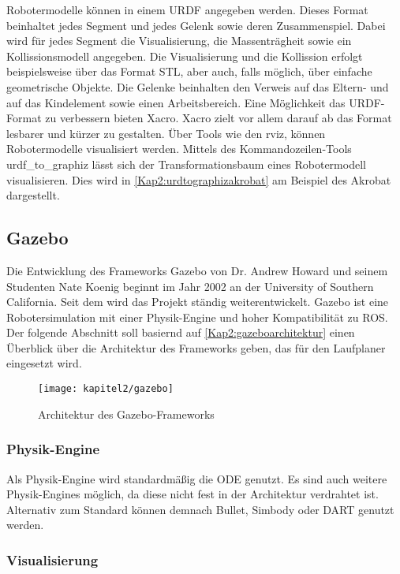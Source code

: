 Robotermodelle können in einem \ac{URDF} angegeben werden. Dieses Format beinhaltet jedes Segment und jedes Gelenk sowie deren Zusammenspiel. Dabei wird für jedes Segment die Visualisierung, die Massenträgheit sowie ein Kollissionsmodell angegeben. Die Visualisierung und die Kollission erfolgt beispielsweise über das Format \ac{STL}, aber auch, falls möglich, über einfache geometrische Objekte. Die Gelenke beinhalten den Verweis auf das Eltern- und auf das Kindelement sowie einen Arbeitsbereich. Eine Möglichkeit das \ac{URDF}-Format zu verbessern bieten \ac{Xacro}. \ac{Xacro} zielt vor allem darauf ab das Format lesbarer und kürzer zu gestalten. Über Tools wie den rviz, können Robotermodelle visualisiert werden. Mittels des Kommandozeilen-Tools urdf\_to\_graphiz lässt sich der Transformationsbaum eines Robotermodell visualisieren. Dies wird in \autoref{Kap2:urdtographizakrobat} am Beispiel des Akrobat dargestellt.

\subsection{Gazebo}

Die Entwicklung des Frameworks Gazebo von Dr. Andrew Howard und seinem Studenten Nate Koenig beginnt im Jahr 2002 an der University of Southern California. Seit dem wird das Projekt ständig weiterentwickelt. Gazebo ist eine Robotersimulation mit einer Physik-Engine und hoher Kompatibilität zu \ac{ROS}. Der folgende Abschnitt soll basiernd auf \autoref{Kap2:gazeboarchitektur} einen Überblick über die Architektur des Frameworks geben, das für den Laufplaner eingesetzt wird. \autocite{gazebosim} \autocite{Koenig-2004-394}

\begin{figure}[b!]
  \centering
  \texttt{[image: kapitel2/gazebo]}
  \caption{Architektur des Gazebo-Frameworks \autocite{Koenig-2004-394}}
  \label{Kap2:gazeboarchitektur}
\end{figure}

\subsubsection{Physik-Engine}

Als Physik-Engine wird standardmäßig die \ac{ODE} genutzt. Es sind auch weitere Physik-Engines möglich, da diese nicht fest in der Architektur verdrahtet ist. Alternativ zum Standard können demnach Bullet, Simbody oder DART genutzt werden.
    
\subsubsection{Visualisierung}

